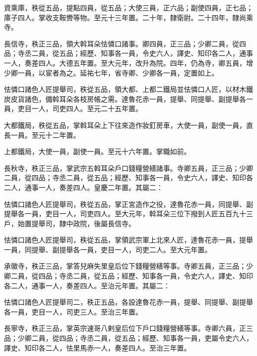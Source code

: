 \begin{pinyinscope}
 資乘庫，秩從五品，提點四員，從五品；大使三員，正六品；副使四員，正七品；庫子四人。掌收支鞍轡等物。至元十三年置。二十年，隸衛尉。二十四年，隸尚乘寺。



 長信寺，秩正三品，領大斡耳朵怯憐口諸事。卿四員，正三品；少卿二員，從四品；寺丞二員，從五品；經歷、知事各一員，令史六人，譯史、知印各二人，通事一人，奏差四人。大德五年置。至大元年，改升為院。四年，仍為寺，卿五員，增少卿一員，以宦者為之。延祐七年，省寺卿、少卿各一員，定置如上。



 怯憐口諸色人匠提舉司，秩從五品，領大都、上都二鐵局並怯憐口人匠，以材木鐵炭皮貨諸色，備斡耳朵各枝房帳之需。達魯花赤一員，提舉、同提舉、副提舉各一員，吏目一人，司吏四人。至元二十五年置。



 大都鐵局，秩從五品，掌斡耳朵上下往來造作妝釘房車，大使一員，副使一員，直長一員。至元十二年置。



 上都鐵局，大使一員，副使一員。至元十六年置。掌職如前。



 長秋寺，秩正三品，掌武宗五斡耳朵戶口錢糧營繕諸事。寺卿五員，正三品；少卿二員，從四品；寺丞二員，從五品；經歷、知事各一員，令史六人，譯史、知印各二人，通事一人，奏差四人。皇慶二年置。其屬二：



 怯憐口諸色人匠提舉司，秩從五品，掌正宮造作之役，達魯花赤一員，同提舉、副提舉各一員，吏目一人，司吏四人。至大元年，斡耳朵三位下撥到人匠五百九十三戶，始置提舉司，隸中政院，後屬長信寺。



 怯憐口諸色人匠提舉司，秩從五品，掌領武宗軍上北來人匠，達魯花赤一員，提舉一員，同提舉、副提舉各一員，吏目一人，司吏二人。至大元年置。



 承徽寺，秩正三品，掌答兒麻失里皇后位下錢糧營繕等事。寺卿五員，正三品；少卿二員，從四品；寺丞二員，從五品；經歷、知事各一員，令史六人，譯史、知印各二人，通事一人，奏差四人。至治元年置。其屬二：



 怯憐口諸色人匠提舉司二，秩正五品，各設達魯花赤一員，提舉、同提舉、副提舉各一員，吏目一人，司吏三人。至治三年置。



 長寧寺，秩正三品，掌英宗速哥八剌皇后位下戶口錢糧營繕等事。寺卿六員，正三品；少卿二員，從四品；寺丞二員，從五品；經歷、知事各一員，吏屬令史六人，譯史、知印各二人，怯里馬赤一人，奏差四人。至治三年置。




\end{pinyinscope}
